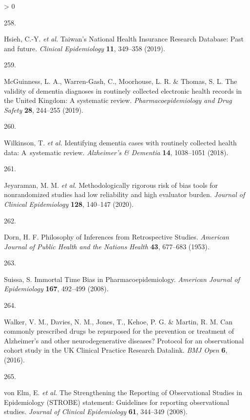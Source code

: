 \documentclass[a4paper, twoside]{templates/ociamthesis}
\newlength{\cslhangindent}
\newlength{\csllabelwidth}
\newenvironment{CSLReferences}[3] %
 {%
  \setlength{\parindent}{0pt}
  \ifodd #1 \everypar{\setlength{\hangindent}{\cslhangindent}}\ignorespaces\fi
  \ifnum #2 > 0
  \setlength{\parskip}{#2\baselineskip}
  \fi
 }%
 {}
\newcommand{\CSLLeftMargin}[1]{\parbox[t]{\maxof{\widthof{#1}}{\csllabelwidth}}{#1}}
\newcommand{\CSLRightInline}[1]{\parbox[t]{\linewidth - \csllabelwidth}{#1}}
\begin{document}
\begin{CSLReferences}{0}{0}
\leavevmode\hypertarget{ref-hsieh2019}{}%
\CSLLeftMargin{258. }
\CSLRightInline{Hsieh, C.-Y. \emph{et al.} Taiwan's {National Health Insurance Research Database}: Past and future. \emph{Clinical Epidemiology} \textbf{11}, 349--358 (2019).}

\leavevmode\hypertarget{ref-mcguinness2019validity}{}%
\CSLLeftMargin{259. }
\CSLRightInline{McGuinness, L. A., Warren-Gash, C., Moorhouse, L. R. \& Thomas, S. L. The validity of dementia diagnoses in routinely collected electronic health records in the {United Kingdom}: A systematic review. \emph{Pharmacoepidemiology and Drug Safety} \textbf{28}, 244--255 (2019).}

\leavevmode\hypertarget{ref-wilkinson2018}{}%
\CSLLeftMargin{260. }
\CSLRightInline{Wilkinson, T. \emph{et al.} Identifying dementia cases with routinely collected health data: A~systematic review. \emph{Alzheimer's \& Dementia} \textbf{14}, 1038--1051 (2018).}

\leavevmode\hypertarget{ref-jeyaraman2020}{}%
\CSLLeftMargin{261. }
\CSLRightInline{Jeyaraman, M. M. \emph{et al.} Methodologically rigorous risk of bias tools for nonrandomized studies had low reliability and high evaluator burden. \emph{Journal of Clinical Epidemiology} \textbf{128}, 140--147 (2020).}

\leavevmode\hypertarget{ref-dorn1953}{}%
\CSLLeftMargin{262. }
\CSLRightInline{Dorn, H. F. Philosophy of {Inferences} from {Retrospective Studies}. \emph{American Journal of Public Health and the Nations Health} \textbf{43}, 677--683 (1953).}

\leavevmode\hypertarget{ref-suissa2008}{}%
\CSLLeftMargin{263. }
\CSLRightInline{Suissa, S. Immortal {Time Bias} in {Pharmacoepidemiology}. \emph{American Journal of Epidemiology} \textbf{167}, 492--499 (2008).}

\leavevmode\hypertarget{ref-walker2016}{}%
\CSLLeftMargin{264. }
\CSLRightInline{Walker, V. M., Davies, N. M., Jones, T., Kehoe, P. G. \& Martin, R. M. Can commonly prescribed drugs be repurposed for the prevention or treatment of {Alzheimer}'s and other neurodegenerative diseases? Protocol for an observational cohort study in the {UK Clinical Practice Research Datalink}. \emph{BMJ Open} \textbf{6}, (2016).}

\leavevmode\hypertarget{ref-vonelm2008}{}%
\CSLLeftMargin{265. }
\CSLRightInline{von Elm, E. \emph{et al.} The {Strengthening} the {Reporting} of {Observational Studies} in {Epidemiology} ({STROBE}) statement: Guidelines for reporting observational studies. \emph{Journal of Clinical Epidemiology} \textbf{61}, 344--349 (2008).}


\end{CSLReferences}
\end{document}
